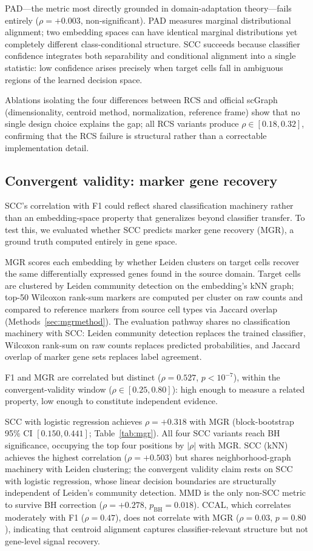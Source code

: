 \documentclass[11pt]{article}
\begin{document}
PAD---the metric most directly grounded in domain-adaptation
theory---fails entirely ($\rho = +0.003$, non-significant). PAD
measures marginal distributional alignment; two embedding spaces can have
identical marginal distributions yet completely different class-conditional
structure. SCC succeeds because classifier confidence integrates both
separability and conditional alignment into a single statistic: low
confidence arises precisely when target cells fall in ambiguous regions
of the learned decision space.

Ablations isolating the four differences between RCS and official scGraph
(dimensionality, centroid method, normalization, reference frame) show
that no single design choice explains the gap; all RCS variants
produce $\rho \in [0.18, 0.32]$, confirming that the RCS failure is
structural rather than a correctable implementation detail.


\subsection{Convergent validity: marker gene recovery}
\label{sec:mgr}

SCC's correlation with F1 could reflect shared classification
machinery rather than an embedding-space property that generalizes
beyond classifier transfer. To test this, we evaluated whether SCC
predicts marker gene recovery (MGR), a ground truth computed entirely
in gene space.

MGR scores each embedding by whether Leiden clusters on target cells
recover the same differentially expressed genes found in the source
domain. Target cells are clustered by Leiden community detection on
the embedding's kNN graph; top-50 Wilcoxon rank-sum markers are
computed per cluster on raw counts and compared to reference markers
from source cell types via Jaccard overlap
(Methods~\ref{sec:mgrmethod}). The evaluation pathway shares no
classification machinery with SCC: Leiden community detection replaces
the trained classifier, Wilcoxon rank-sum on raw counts replaces
predicted probabilities, and Jaccard overlap of marker gene sets
replaces label agreement.

F1 and MGR are correlated but distinct ($\rho = 0.527$,
$p < 10^{-7}$), within the convergent-validity window
($\rho \in [0.25, 0.80]$): high enough to measure a related property,
low enough to constitute independent evidence.

SCC with logistic regression achieves $\rho = +0.318$ with MGR
(block-bootstrap 95\% CI $[0.150, 0.441]$;
Table~\ref{tab:mgr}). All four SCC variants reach BH significance,
occupying the top four positions by $|\rho|$ with MGR. SCC (kNN)
achieves the highest correlation ($\rho = +0.503$) but shares
neighborhood-graph machinery with Leiden clustering; the convergent
validity claim rests on SCC with logistic regression, whose linear
decision boundaries are structurally independent of Leiden's community
detection. MMD is the only non-SCC metric to survive BH correction
($\rho = +0.278$, $p_{\text{BH}} = 0.018$). CCAL, which correlates
moderately with F1 ($\rho = 0.47$), does not correlate with MGR
($\rho = 0.03$, $p = 0.80$), indicating that centroid alignment
captures classifier-relevant structure but not gene-level signal
recovery.
\end{document}
